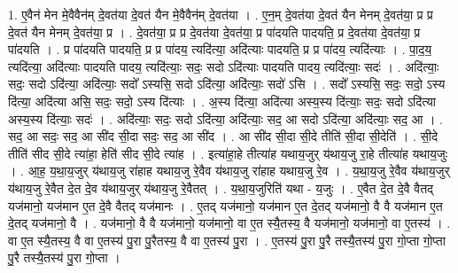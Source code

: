 \documentclass[17pt]{extarticle}
\begin{document}
1. ए॒वैन॑ मेन मे॒वैवैन॑म् दे॒वत॑या दे॒वत॑ यैन मे॒वैवैन॑म् दे॒वत॑या । . ए॒न॒म् दे॒वत॑या दे॒वत॑ यैन मेनम् दे॒वत॑या॒ प्र प्र दे॒वत॑ यैन मेनम् दे॒वत॑या॒ प्र । . दे॒वत॑या॒ प्र प्र दे॒वत॑या दे॒वत॑या॒ प्र पा॑दयति पादयति॒ प्र दे॒वत॑या दे॒वत॑या॒ प्र पा॑दयति । . प्र पा॑दयति पादयति॒ प्र प्र पा॑दय॒ त्यदि॑त्या॒ अदि॑त्याः पादयति॒ प्र प्र पा॑दय॒ त्यदि॑त्याः । . पा॒द॒य॒ त्यदि॑त्या॒ अदि॑त्याः पादयति पादय॒ त्यदि॑त्याः॒ सदः॒ सदो ऽदि॑त्याः पादयति पादय॒ त्यदि॑त्याः॒ सदः॑ । . अदि॑त्याः॒ सदः॒ सदो ऽदि॑त्या॒ अदि॑त्याः॒ सदो᳚ ऽस्यसि॒ सदो ऽदि॑त्या॒ अदि॑त्याः॒ सदो॑ ऽसि । . सदो᳚ ऽस्यसि॒ सदः॒ सदो॒ ऽस्य दि॑त्या॒ अदि॑त्या असि॒ सदः॒ सदो॒ ऽस्य दि॑त्याः । . अ॒स्य दि॑त्या॒ अदि॑त्या अस्य॒स्य दि॑त्याः॒ सदः॒ सदो ऽदि॑त्या अस्य॒स्य दि॑त्याः॒ सदः॑ । . अदि॑त्याः॒ सदः॒ सदो ऽदि॑त्या॒ अदि॑त्याः॒ सद॒ आ सदो ऽदि॑त्या॒ अदि॑त्याः॒ सद॒ आ । . सद॒ आ सदः॒ सद॒ आ सी॑द सी॒दा सदः॒ सद॒ आ सी॑द । . आ सी॑द सी॒दा सी॒दे तीति॑ सी॒दा सी॒देति॑ । . सी॒दे तीति॑ सीद सी॒दे त्या॑हा॒ हेति॑ सीद सी॒दे त्या॑ह । . इत्या॑हा॒हे तीत्या॑ह यथाय॒जुर् य॑थाय॒जु रा॒हे तीत्या॑ह यथाय॒जुः । . आ॒ह॒ य॒था॒य॒जुर् य॑थाय॒जु रा॑हाह यथाय॒जु रे॒वैव य॑थाय॒जु रा॑हाह यथाय॒जु रे॒व । . य॒था॒य॒जु रे॒वैव य॑थाय॒जुर् य॑थाय॒जु रे॒वैत दे॒त दे॒व य॑थाय॒जुर् य॑थाय॒जु रे॒वैतत् । . य॒था॒य॒जुरिति॑ यथा - य॒जुः । . ए॒वैत दे॒त दे॒वै वैतद् यज॑मानो॒ यज॑मान ए॒त दे॒वै वैतद् यज॑मानः । . ए॒तद् यज॑मानो॒ यज॑मान ए॒त दे॒तद् यज॑मानो॒ वै वै यज॑मान ए॒त दे॒तद् यज॑मानो॒ वै । . यज॑मानो॒ वै वै यज॑मानो॒ यज॑मानो॒ वा ए॒त स्यै॒तस्य॒ वै यज॑मानो॒ यज॑मानो॒ वा ए॒तस्य॑ । . वा ए॒त स्यै॒तस्य॒ वै वा ए॒तस्य॑ पु॒रा पु॒रैतस्य॒ वै वा ए॒तस्य॑ पु॒रा । . ए॒तस्य॑ पु॒रा पु॒रै तस्यै॒तस्य॑ पु॒रा गो॒प्ता गो॒प्ता पु॒रै तस्यै॒तस्य॑ पु॒रा गो॒प्ता । \newline
\end{document}
